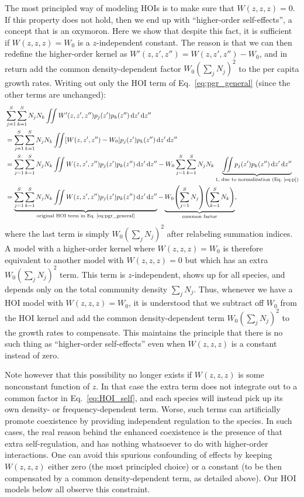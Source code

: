 \documentclass[10pt]{article}
\newcommand{\ud}{\text{d}}
\let\originalleft\left
\let\originalright\right
\renewcommand{\left}{\mathopen{}\mathclose\bgroup\originalleft}
\renewcommand{\right}{\aftergroup\egroup\originalright}
\begin{document}
The most principled way of modeling HOIs is to make sure that $W(z,z,z) = 0$. If this property does not hold, then we end up with ``higher-order self-effects'', a concept that is an oxymoron. Here we show that despite this fact, it is sufficient if $W(z,z,z) = W_0$ is a $z$-independent constant. The reason is that we can then redefine the higher-order kernel as $W'(z,z',z'') = W(z,z',z'') - W_0$, and in return add the common density-dependent factor $W_0 (\sum_j N_j)^2$ to the per capita growth rates. Writing out only the HOI term of Eq.~\ref{eq:pgr_general} (since the other terms are unchanged):
\begin{equation}
  \label{eq:HOI_self}
  \begin{split}
  &    \sum_{j=1}^S \sum_{k=1}^S N_j N_k
  \iint W'(z,z',z'') p_j(z') p_k(z'') \,\ud z' \,\ud z''
  \\ &=\sum_{j=1}^S \sum_{k=1}^S N_j N_k
  \iint \left[W(z,z',z'') - W_0\right] p_j(z') p_k(z'')
  \,\ud z' \,\ud z''
  \\ &= \sum_{j=1}^S \sum_{k=1}^S N_j N_k
  \iint W(z,z',z'') p_j(z') p_k(z'') \,\ud z' \,\ud z''
  - W_0 \sum_{j=1}^S \sum_{k=1}^S N_j N_k
  \underbrace{\iint p_j(z') p_k(z'') \,\ud z' \,\ud 
  z''}_{\text{1, due to normalization (Eq.~\ref{eq:p})}}
  \\ &= \underbrace{\sum_{j=1}^S \sum_{k=1}^S N_j N_k
  \iint W(z,z',z'') p_j(z') p_k(z'') \,\ud z' \,\ud z''}_
  {\text{original HOI term in Eq.~\ref{eq:pgr_general}}}
  - \underbrace{W_0 \left(\sum_{j=1}^S N_j\right)
  \left(\sum_{k=1}^S N_k\right)}_
  {\text{common factor}} ,
  \end{split}
\end{equation}
where the last term is simply $W_0 (\sum_j N_j)^2$ after relabeling summation indices. A model with a higher-order kernel where $W(z,z,z) = W_0$ is therefore equivalent to another model with $W(z,z,z)=0$ but which has an extra $W_0 (\sum_j N_j)^2$ term. This term is $z$-independent, shows up for all species, and depends only on the total community density $\sum_j N_j$. Thus, whenever we have a HOI model with $W(z,z,z)=W_0$, it is understood that we subtract off $W_0$ from the HOI kernel and add the common density-dependent term $W_0(\sum_j N_j)^2$ to the growth rates to compensate. This maintains the principle that there is no such thing as ``higher-order self-effects'' even when $W(z,z,z)$ is a constant instead of zero.

Note however that this possibility no longer exists if $W(z,z,z)$ is some nonconstant function of $z$. In that case the extra term does not integrate out to a common factor in Eq.~\ref{eq:HOI_self}, and each species will instead pick up its own density- or frequency-dependent term. Worse, such terms can artificially promote coexistence by providing independent regulation to the species. In such cases, the real reason behind the enhanced coexistence is the presence of that extra self-regulation, and has nothing whatsoever to do with higher-order interactions. One can avoid this spurious confounding of effects by keeping $W(z,z,z)$ either zero (the most principled choice) or a constant (to be then compensated by a common density-dependent term, as detailed above). Our HOI models below all observe this constraint.
\end{document}
